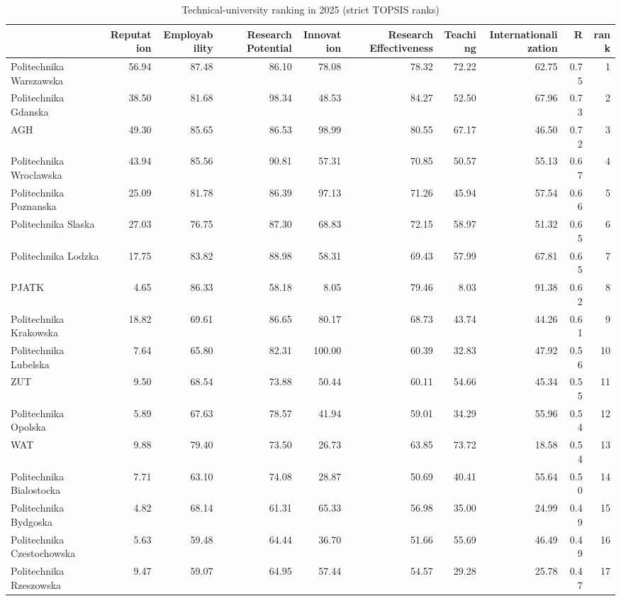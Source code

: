 \begin{table}[htbp]
\centering
\caption{Technical-university ranking in 2025 (strict TOPSIS ranks)}
\label{tab:e1-ranking}
\begin{tabular}{lrrrrrrrrr}
\toprule
 & Reputation & Employability & Research Potential & Innovation & Research Effectiveness & Teaching & Internationalization & R & rank \\
\midrule
Politechnika Warszawska & 56.94 & 87.48 & 86.10 & 78.08 & 78.32 & 72.22 & 62.75 & 0.75 & 1 \\
Politechnika Gdanska & 38.50 & 81.68 & 98.34 & 48.53 & 84.27 & 52.50 & 67.96 & 0.73 & 2 \\
AGH & 49.30 & 85.65 & 86.53 & 98.99 & 80.55 & 67.17 & 46.50 & 0.72 & 3 \\
Politechnika Wroclawska & 43.94 & 85.56 & 90.81 & 57.31 & 70.85 & 50.57 & 55.13 & 0.67 & 4 \\
Politechnika Poznanska & 25.09 & 81.78 & 86.39 & 97.13 & 71.26 & 45.94 & 57.54 & 0.66 & 5 \\
Politechnika Slaska & 27.03 & 76.75 & 87.30 & 68.83 & 72.15 & 58.97 & 51.32 & 0.65 & 6 \\
Politechnika Lodzka & 17.75 & 83.82 & 88.98 & 58.31 & 69.43 & 57.99 & 67.81 & 0.65 & 7 \\
PJATK & 4.65 & 86.33 & 58.18 & 8.05 & 79.46 & 8.03 & 91.38 & 0.62 & 8 \\
Politechnika Krakowska & 18.82 & 69.61 & 86.65 & 80.17 & 68.73 & 43.74 & 44.26 & 0.61 & 9 \\
Politechnika Lubelska & 7.64 & 65.80 & 82.31 & 100.00 & 60.39 & 32.83 & 47.92 & 0.56 & 10 \\
ZUT & 9.50 & 68.54 & 73.88 & 50.44 & 60.11 & 54.66 & 45.34 & 0.55 & 11 \\
Politechnika Opolska & 5.89 & 67.63 & 78.57 & 41.94 & 59.01 & 34.29 & 55.96 & 0.54 & 12 \\
WAT & 9.88 & 79.40 & 73.50 & 26.73 & 63.85 & 73.72 & 18.58 & 0.54 & 13 \\
Politechnika Bialostocka & 7.71 & 63.10 & 74.08 & 28.87 & 50.69 & 40.41 & 55.64 & 0.50 & 14 \\
Politechnika Bydgoska & 4.82 & 68.14 & 61.31 & 65.33 & 56.98 & 35.00 & 24.99 & 0.49 & 15 \\
Politechnika Czestochowska & 5.63 & 59.48 & 64.44 & 36.70 & 51.66 & 55.69 & 46.49 & 0.49 & 16 \\
Politechnika Rzeszowska & 9.47 & 59.07 & 64.95 & 57.44 & 54.57 & 29.28 & 25.78 & 0.47 & 17 \\

\end{tabular}
\end{table}
